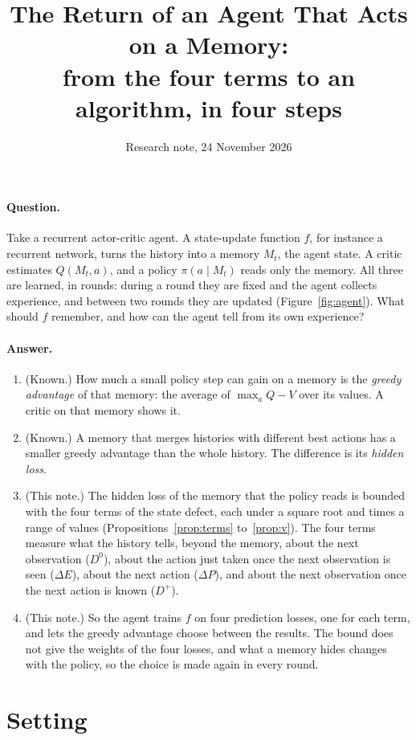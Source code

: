 \documentclass[11pt]{article}
\title{The Return of an Agent That Acts on a Memory:\\ from the four terms to an algorithm, in four steps}
\author{}
\date{Research note, 24 November 2026}
\theoremstyle{definition}
\newcommand{\dE}{\Delta E}
\newcommand{\dP}{\Delta P}
\begin{document}
\maketitle

\paragraph{Question.} Take a recurrent actor-critic agent. A state-update function $f$, for instance a recurrent network, turns the history into a memory $M_t$, the agent state. A critic estimates $Q(M_t,a)$, and a policy $\pi(a\mid M_t)$ reads only the memory. All three are learned, in rounds: during a round they are fixed and the agent collects experience, and between two rounds they are updated (Figure~\ref{fig:agent}). What should $f$ remember, and how can the agent tell from its own experience?

\paragraph{Answer.}
\begin{enumerate}
\item (Known.) How much a small policy step can gain on a memory is the \emph{greedy advantage} of that memory: the average of $\max_aQ-V$ over its values. A critic on that memory shows it.
\item (Known.) A memory that merges histories with different best actions has a smaller greedy advantage than the whole history. The difference is its \emph{hidden loss}.
\item (This note.) The hidden loss of the memory that the policy reads is bounded with the four terms of the state defect, each under a square root and times a range of values (Propositions~\ref{prop:terms} to~\ref{prop:v}). The four terms measure what the history tells, beyond the memory, about the next observation ($D^0$), about the action just taken once the next observation is seen ($\dE$), about the next action ($\dP$), and about the next observation once the next action is known ($D^+$).
\item (This note.) So the agent trains $f$ on four prediction losses, one for each term, and lets the greedy advantage choose between the results. The bound does not give the weights of the four losses, and what a memory hides changes with the policy, so the choice is made again in every round.
\end{enumerate}

\section{Setting}
\end{document}
